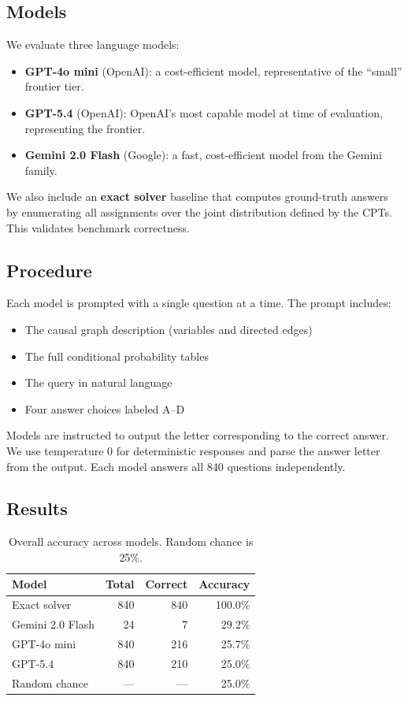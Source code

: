 \documentclass[11pt,a4paper]{article}
\begin{document}
\subsection{Models}

We evaluate three language models:

\begin{itemize}
  \item \textbf{GPT-4o mini} (OpenAI): a cost-efficient model, representative of the ``small'' frontier tier.
  \item \textbf{GPT-5.4} (OpenAI): OpenAI's most capable model at time of evaluation, representing the frontier.
  \item \textbf{Gemini 2.0 Flash} (Google): a fast, cost-efficient model from the Gemini family.
\end{itemize}

We also include an \textbf{exact solver} baseline that computes ground-truth answers by enumerating all assignments over the joint distribution defined by the CPTs. This validates benchmark correctness.

\subsection{Procedure}

Each model is prompted with a single question at a time. The prompt includes:
\begin{itemize}
  \item The causal graph description (variables and directed edges)
  \item The full conditional probability tables
  \item The query in natural language
  \item Four answer choices labeled A--D
\end{itemize}

Models are instructed to output the letter corresponding to the correct answer. We use temperature 0 for deterministic responses and parse the answer letter from the output. Each model answers all 840 questions independently.

\subsection{Results}

\begin{table}[h]
\centering
\caption{Overall accuracy across models. Random chance is 25\%.}
\label{tab:main}
\begin{tabular}{lrrr}
\toprule
\textbf{Model} & \textbf{Total} & \textbf{Correct} & \textbf{Accuracy} \\
\midrule
Exact solver & 840 & 840 & 100.0\% \\
\midrule
Gemini 2.0 Flash & 24 & 7 & 29.2\% \\
GPT-4o mini & 840 & 216 & 25.7\% \\
GPT-5.4 & 840 & 210 & 25.0\% \\
\midrule
Random chance & --- & --- & 25.0\% \\
\bottomrule
\end{tabular}
\end{table}
\end{document}
